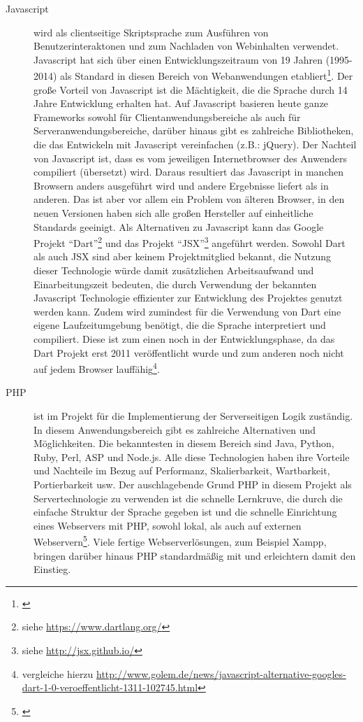 \begin{description}
  \clearpage
  \item[Javascript] wird als clientseitige Skriptsprache zum Ausführen von Benutzerinteraktonen und zum Nachladen von Webinhalten verwendet. Javascript hat sich über einen Entwicklungszeitraum von 19 Jahren (1995-2014) als Standard in diesen Bereich von Webanwendungen etabliert\footnote{\citet[S.~2]{powers2007}}. Der große Vorteil von Javascript ist die Mächtigkeit, die die Sprache durch 14 Jahre Entwicklung erhalten hat. Auf Javascript basieren heute ganze Frameworks sowohl für Clientanwendungsbereiche als auch für Serveranwendungsbereiche\footnotemark, darüber hinaus gibt es zahlreiche Bibliotheken, die das Entwickeln mit Javascript vereinfachen (z.B.: jQuery). Der Nachteil von Javascript ist, dass es vom jeweiligen Internetbrowser des Anwenders compiliert (übersetzt) wird. Daraus resultiert das Javascript in manchen Browsern anders ausgeführt wird und andere Ergebnisse liefert als in anderen. Das ist aber vor allem ein Problem von älteren Browser, in den neuen Versionen haben sich alle großen Hersteller auf einheitliche Standards geeinigt. Als Alternativen zu Javascript kann das Google Projekt "`Dart"'\footnote{siehe \url{https://www.dartlang.org/}} und das Projekt "`JSX"'\footnote{siehe \url{http://jsx.github.io/}} angeführt werden. Sowohl Dart als auch JSX sind aber keinem Projektmitglied bekannt, die Nutzung dieser Technologie würde damit zusätzlichen Arbeitsaufwand und Einarbeitungszeit bedeuten, die durch Verwendung der bekannten Javascript Technologie effizienter zur Entwicklung des Projektes genutzt werden kann. Zudem wird zumindest für die Verwendung von Dart eine eigene Laufzeitumgebung benötigt, die die Sprache interpretiert und compiliert. Diese ist zum einen noch in der Entwicklungsphase, da das Dart Projekt erst 2011 veröffentlicht wurde und zum anderen noch nicht auf jedem Browser lauffähig\footnote{vergleiche hierzu \url{http://www.golem.de/news/javascript-alternative-googles-dart-1-0-veroeffentlicht-1311-102745.html}}.


  \item[PHP] ist im Projekt für die Implementierung der Serverseitigen Logik zuständig. In diesem Anwendungsbereich gibt es zahlreiche Alternativen und Möglichkeiten. Die bekanntesten in diesem Bereich sind Java, Python, Ruby, Perl, ASP und 
  Node.js. Alle diese Technologien haben ihre Vorteile und Nachteile im Bezug auf Performanz, Skalierbarkeit, Wartbarkeit, Portierbarkeit usw. Der auschlagebende Grund PHP in diesem Projekt als Servertechnologie zu verwenden ist die schnelle Lernkruve, die durch die einfache Struktur der Sprache gegeben ist und die schnelle Einrichtung eines Webservers mit PHP, sowohl lokal, als auch auf externen Webservern\footnote{\citet[S.~14]{peyton2005}}. Viele fertige Webserverlösungen, zum Beispiel Xampp, bringen darüber hinaus PHP standardmäßig mit und erleichtern damit den Einstieg.


\end{description}
